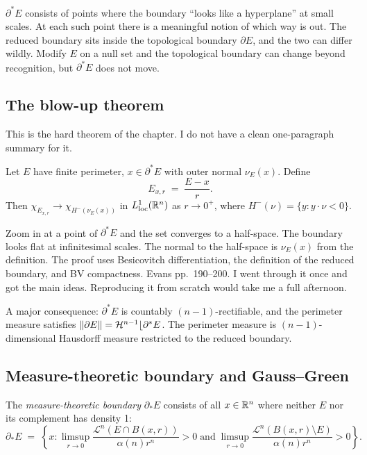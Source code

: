 $\partial^* E$ consists of points where the boundary ``looks like a hyperplane'' at small scales. At each such point there is a meaningful notion of which way is out. The reduced boundary sits inside the topological boundary $\partial E$, and the two can differ wildly. Modify $E$ on a null set and the topological boundary can change beyond recognition, but $\partial^* E$ does not move.

\subsection{The blow-up theorem}\label{subsec:blowup}

This is the hard theorem of the chapter. I do not have a clean one-paragraph summary for it.

\begin{theorem}\label{thm:blowup}
Let $E$ have finite perimeter, $x \in \partial^* E$ with outer normal $\nu_E(x)$. Define
\[
  E_{x,r} \;=\; \frac{E - x}{r}.
\]
Then $\chi_{E_{x,r}} \to \chi_{H^-(\nu_E(x))}$ in $L^1_{\mathrm{loc}}(\mathbb{R}^n)$ as $r \to 0^+$, where $H^-(\nu) = \{y : y \cdot \nu < 0\}$.
\end{theorem}

Zoom in at a point of $\partial^* E$ and the set converges to a half-space. The boundary looks flat at infinitesimal scales. The normal to the half-space is $\nu_E(x)$ from the definition. The proof uses Besicovitch differentiation, the definition of the reduced boundary, and BV compactness. Evans pp.\ 190--200. I went through it once and got the main ideas. Reproducing it from scratch would take me a full afternoon.

\begin{remark}\label{rmk:rectifiability}
A major consequence: $\partial^* E$ is countably $(n-1)$-rectifiable, and the perimeter measure satisfies $\left\|\partial E\right\| = \mathcal{H}^{n-1} \lfloor \partial^* E$. The perimeter measure is $(n-1)$-dimensional Hausdorff measure restricted to the reduced boundary.
\end{remark}

\subsection{Measure-theoretic boundary and Gauss--Green}\label{subsec:gauss-green}

\begin{definition}\label{def:mt-boundary}
The \emph{measure-theoretic boundary} $\partial_* E$ consists of all $x \in \mathbb{R}^n$ where neither $E$ nor its complement has density 1:
\[
  \partial_* E \;=\; \left\{x : \limsup_{r \to 0} \frac{\mathcal{L}^n(E \cap B(x,r))}{\alpha(n)r^n} > 0 \;\text{and}\; \limsup_{r \to 0} \frac{\mathcal{L}^n(B(x,r) \setminus E)}{\alpha(n)r^n} > 0\right\}.
\]
\end{definition}

